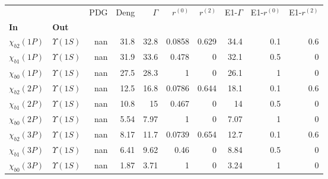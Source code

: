 \begin{tabular}{l|l|r|r|r|r|r|r|r|r}
\toprule
                &                &  PDG &  Deng &  $\Gamma$ &  $r^{(0)}$ &  $r^{(2)}$ &  E1-$\Gamma$ &  E1-$r^{(0)}$ &  E1-$r^{(2)}$ \\
\textbf{In} & \textbf{Out} &      &       &           &            &            &              &               &               \\
\midrule
\textbf{$\chi_{b2}(1P)$} & \textbf{$\Upsilon(1S)$} &  nan &  31.8 &      32.8 &     0.0858 &      0.629 &         34.4 &           0.1 &           0.6 \\
\textbf{$\chi_{b1}(1P)$} & \textbf{$\Upsilon(1S)$} &  nan &  31.9 &      33.6 &      0.478 &          0 &         32.1 &           0.5 &             0 \\
\textbf{$\chi_{b0}(1P)$} & \textbf{$\Upsilon(1S)$} &  nan &  27.5 &      28.3 &          1 &          0 &         26.1 &             1 &             0 \\
\textbf{$\chi_{b2}(2P)$} & \textbf{$\Upsilon(1S)$} &  nan &  12.5 &      16.8 &     0.0786 &      0.644 &         18.1 &           0.1 &           0.6 \\
\textbf{$\chi_{b1}(2P)$} & \textbf{$\Upsilon(1S)$} &  nan &  10.8 &        15 &      0.467 &          0 &           14 &           0.5 &             0 \\
\textbf{$\chi_{b0}(2P)$} & \textbf{$\Upsilon(1S)$} &  nan &  5.54 &      7.97 &          1 &          0 &         7.07 &             1 &             0 \\
\textbf{$\chi_{b2}(3P)$} & \textbf{$\Upsilon(1S)$} &  nan &  8.17 &      11.7 &     0.0739 &      0.654 &         12.7 &           0.1 &           0.6 \\
\textbf{$\chi_{b1}(3P)$} & \textbf{$\Upsilon(1S)$} &  nan &  6.41 &      9.62 &       0.46 &          0 &         8.84 &           0.5 &             0 \\
\textbf{$\chi_{b0}(3P)$} & \textbf{$\Upsilon(1S)$} &  nan &  1.87 &      3.71 &          1 &          0 &         3.24 &             1 &             0 \\
\bottomrule
\end{tabular}
